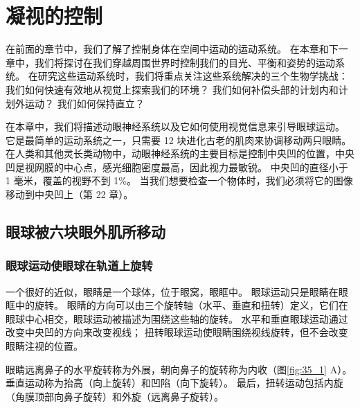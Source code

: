 \chapter{凝视的控制} \label{chap:chap35}

在前面的章节中，我们了解了控制身体在空间中运动的运动系统。 在本章和下一章中，我们将探讨在我们穿越周围世界时控制我们的目光、平衡和姿势的运动系统。 在研究这些运动系统时，我们将重点关注这些系统解决的三个生物学挑战：我们如何快速有效地从视觉上探索我们的环境？ 我们如何补偿头部的计划内和计划外运动？ 我们如何保持直立？

在本章中，我们将描述动眼神经系统以及它如何使用视觉信息来引导眼球运动。 它是最简单的运动系统之一，只需要 12 块进化古老的肌肉来协调移动两只眼睛。 在人类和其他灵长类动物中，动眼神经系统的主要目标是控制中央凹的位置，中央凹是视网膜的中心点，感光细胞密度最高，因此视力最敏锐。 中央凹的直径小于 1 毫米，覆盖的视野不到 1\%。 当我们想要检查一个物体时，我们必须将它的图像移动到中央凹上（第 22 章）。

\section{眼球被六块眼外肌所移动}
\subsection{眼球运动使眼球在轨道上旋转}
一个很好的近似，眼睛是一个球体，位于眼窝，眼眶中。 眼球运动只是眼睛在眼眶中的旋转。 眼睛的方向可以由三个旋转轴（水平、垂直和扭转）定义，它们在眼球中心相交，眼球运动被描述为围绕这些轴的旋转。 水平和垂直眼球运动通过改变中央凹的方向来改变视线； 扭转眼球运动使眼睛围绕视线旋转，但不会改变眼睛注视的位置。

眼睛远离鼻子的水平旋转称为外展，朝向鼻子的旋转称为内收（图\ref{fig:35_1} A）。 
垂直运动称为抬高（向上旋转）和凹陷（向下旋转）。 最后，扭转运动包括内旋（角膜顶部向鼻子旋转）和外旋（远离鼻子旋转）。


